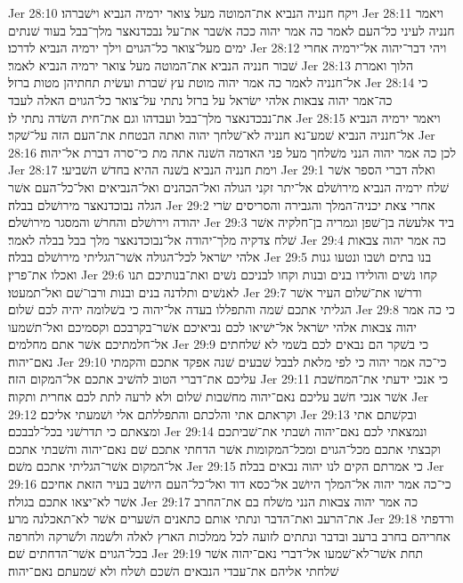 Jer 28:10  ויקח חנניה הנביא את־המוטה מעל צואר ירמיה הנביא וישׁברהו׃
Jer 28:11  ויאמר חנניה לעיני כל־העם לאמר כה אמר יהוה ככה אשׁבר את־על נבכדנאצר מלך־בבל בעוד שׁנתים ימים מעל־צואר כל־הגוים וילך ירמיה הנביא לדרכו׃
Jer 28:12  ויהי דבר־יהוה אל־ירמיה אחרי שׁבור חנניה הנביא את־המוטה מעל צואר ירמיה הנביא לאמר׃
Jer 28:13  הלוך ואמרת אל־חנניה לאמר כה אמר יהוה מוטת עץ שׁברת ועשׂית תחתיהן מטות ברזל׃
Jer 28:14  כי כה־אמר יהוה צבאות אלהי ישׂראל על ברזל נתתי על־צואר כל־הגוים האלה לעבד את־נבכדנאצר מלך־בבל ועבדהו וגם את־חית השׂדה נתתי לו׃
Jer 28:15  ויאמר ירמיה הנביא אל־חנניה הנביא שׁמע־נא חנניה לא־שׁלחך יהוה ואתה הבטחת את־העם הזה על־שׁקר׃
Jer 28:16  לכן כה אמר יהוה הנני משׁלחך מעל פני האדמה השׁנה אתה מת כי־סרה דברת אל־יהוה׃
Jer 28:17  וימת חנניה הנביא בשׁנה ההיא בחדשׁ השׁביעי׃
Jer 29:1  ואלה דברי הספר אשׁר שׁלח ירמיה הנביא מירושׁלם אל־יתר זקני הגולה ואל־הכהנים ואל־הנביאים ואל־כל־העם אשׁר הגלה נבוכדנאצר מירושׁלם בבלה׃
Jer 29:2  אחרי צאת יכניה־המלך והגבירה והסריסים שׂרי יהודה וירושׁלם והחרשׁ והמסגר מירושׁלם׃
Jer 29:3  ביד אלעשׂה בן־שׁפן וגמריה בן־חלקיה אשׁר שׁלח צדקיה מלך־יהודה אל־נבוכדנאצר מלך בבל בבלה לאמר׃
Jer 29:4  כה אמר יהוה צבאות אלהי ישׂראל לכל־הגולה אשׁר־הגליתי מירושׁלם בבלה׃
Jer 29:5  בנו בתים ושׁבו ונטעו גנות ואכלו את־פרין׃
Jer 29:6  קחו נשׁים והולידו בנים ובנות וקחו לבניכם נשׁים ואת־בנותיכם תנו לאנשׁים ותלדנה בנים ובנות ורבו־שׁם ואל־תמעטו׃
Jer 29:7  ודרשׁו את־שׁלום העיר אשׁר הגליתי אתכם שׁמה והתפללו בעדה אל־יהוה כי בשׁלומה יהיה לכם שׁלום׃
Jer 29:8  כי כה אמר יהוה צבאות אלהי ישׂראל אל־ישׁיאו לכם נביאיכם אשׁר־בקרבכם וקסמיכם ואל־תשׁמעו אל־חלמתיכם אשׁר אתם מחלמים׃
Jer 29:9  כי בשׁקר הם נבאים לכם בשׁמי לא שׁלחתים נאם־יהוה׃
Jer 29:10  כי־כה אמר יהוה כי לפי מלאת לבבל שׁבעים שׁנה אפקד אתכם והקמתי עליכם את־דברי הטוב להשׁיב אתכם אל־המקום הזה׃
Jer 29:11  כי אנכי ידעתי את־המחשׁבת אשׁר אנכי חשׁב עליכם נאם־יהוה מחשׁבות שׁלום ולא לרעה לתת לכם אחרית ותקוה׃
Jer 29:12  וקראתם אתי והלכתם והתפללתם אלי ושׁמעתי אליכם׃
Jer 29:13  ובקשׁתם אתי ומצאתם כי תדרשׁני בכל־לבבכם׃
Jer 29:14  ונמצאתי לכם נאם־יהוה ושׁבתי את־שׁביתכם וקבצתי אתכם מכל־הגוים ומכל־המקומות אשׁר הדחתי אתכם שׁם נאם־יהוה והשׁבתי אתכם אל־המקום אשׁר־הגליתי אתכם משׁם׃
Jer 29:15  כי אמרתם הקים לנו יהוה נבאים בבלה׃
Jer 29:16  כי־כה אמר יהוה אל־המלך היושׁב אל־כסא דוד ואל־כל־העם היושׁב בעיר הזאת אחיכם אשׁר לא־יצאו אתכם בגולה׃
Jer 29:17  כה אמר יהוה צבאות הנני משׁלח בם את־החרב את־הרעב ואת־הדבר ונתתי אותם כתאנים השׁערים אשׁר לא־תאכלנה מרע׃
Jer 29:18  ורדפתי אחריהם בחרב ברעב ובדבר ונתתים לזועה לכל ממלכות הארץ לאלה ולשׁמה ולשׁרקה ולחרפה בכל־הגוים אשׁר־הדחתים שׁם׃
Jer 29:19  תחת אשׁר־לא־שׁמעו אל־דברי נאם־יהוה אשׁר שׁלחתי אליהם את־עבדי הנבאים השׁכם ושׁלח ולא שׁמעתם נאם־יהוה׃
